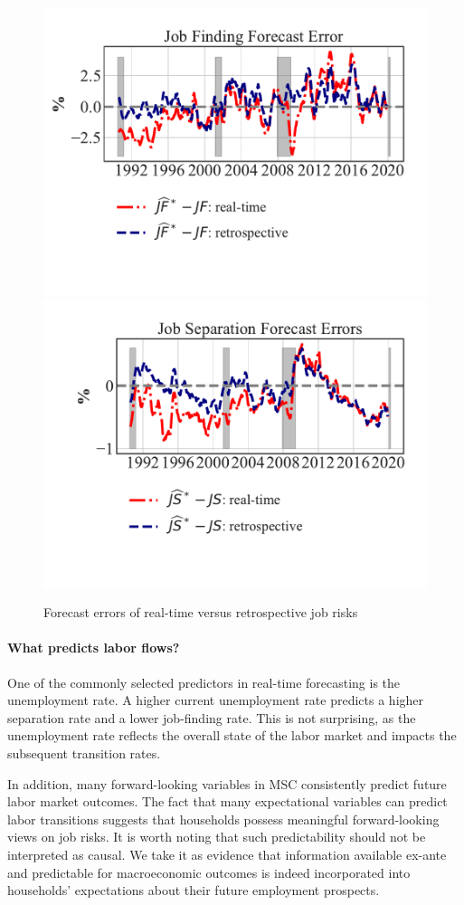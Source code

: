 \begin{figure}[!ht] \centering  %
\caption{Forecast errors of real-time versus retrospective job risks} 
\label{fig:why_real_time}
\includegraphics[width=0.49\linewidth]{text/chapter2/Figures/real_time_one_shot_comparison_1step_JF.pdf} 
\includegraphics[width=0.49\linewidth]{text/chapter2/Figures/real_time_one_shot_comparison_1step_JS.pdf} 
\end{figure}

\paragraph{What predicts labor flows?} 
One of the commonly selected predictors in real-time forecasting is the unemployment rate. A higher current unemployment rate predicts a higher separation rate and a lower job-finding rate. This is not surprising, as the unemployment rate reflects the overall state of the labor market and impacts the subsequent transition rates. 

In addition, many forward-looking variables in MSC consistently predict future labor market outcomes. The fact that many expectational variables can predict labor transitions suggests that households possess meaningful forward-looking views on job risks. It is worth noting that such predictability should not be interpreted as causal. We take it as evidence that information available ex-ante and predictable for macroeconomic outcomes is indeed incorporated into households' expectations about their future employment prospects.   

